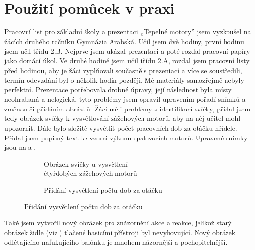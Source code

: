 \section{Použití pomůcek v praxi}\label{sc:pouzitiVPraxi}
{Pracovní list pro základní školy a prezentaci ,,Tepelné motory'' jsem vyzkoušel na žácích druhého ročníku Gymnázia Arabská. Učil jsem dvě hodiny, první hodinu jsem učil třídu 2.B. Nejprve jsem ukázal prezentaci a poté rozdal pracovní papíry jako domácí úkol. Ve druhé hodině jsem učil třídu 2.A, rozdal jsem pracovní listy před hodinou, aby je žáci vyplňovali současně s prezentací a více se soustředili, termín odevzdání byl o několik hodin později.}\odst
{Mé materiály samozřejmě nebyly perfektní. Prezentace potřebovala drobné úpravy, její následnost byla místy neohrabaná a nelogická, tyto problémy jsem opravil upravením pořadí snímků a změnou či přidáním obrázků.}\odst
{Žáci měli problémy s identifikací svíčky, přidal jsem tedy obrázek svíčky k vysvětlování zážehových motorů, aby na něj učitel mohl upozornit. Dále bylo složité vysvětlit počet pracovních dob za otáčku hřídele. Přidal jsem popisný text ke vzorci výkonu spalovacích motorů. Upravené snímky jsou na  a .}
\begin{figure}[H]
    \begingroup
    \makeatletter
    \renewcommand\thesubfigure{\thefigure~--~\@nameuse{subfiglabel@\alph{subfigure}}}
    \newcommand{\subfiglabel@a}{vlevo}
    \newcommand{\subfiglabel@b}{vpravo}
    \captionsetup[subfigure]{labelformat=simple, labelsep=colon}
    \renewcommand\p@subfigure{}
    \makeatother
    \begin{subfigure}{0.47\textwidth}
        \centering
        \setlength{\fboxsep}{0pt}
        \caption{Obrázek svíčky u vysvětlení\\čtyřdobých zážehových motorů \jaObr}
        \label{obr:svickaSlide}
    \end{subfigure}\hfill
    \begin{subfigure}{0.47\textwidth}
        \centering
        \setlength{\fboxsep}{0pt}
        \caption{Přidání vysvětlení počtu dob za otáčku \jaObr}
        \label{obr:vzorceSlide}
    \end{subfigure}
    \endgroup
\end{figure}
{Také jsem vytvořil nový obrázek pro znázornění akce a reakce, jelikož starý obrázek židle (viz ) tlačené hasicími přístroji byl nevyhovující. Nový obrázek  odlétajícího nafukujícího balónku je mnohem názornější a pochopitelnější.}
